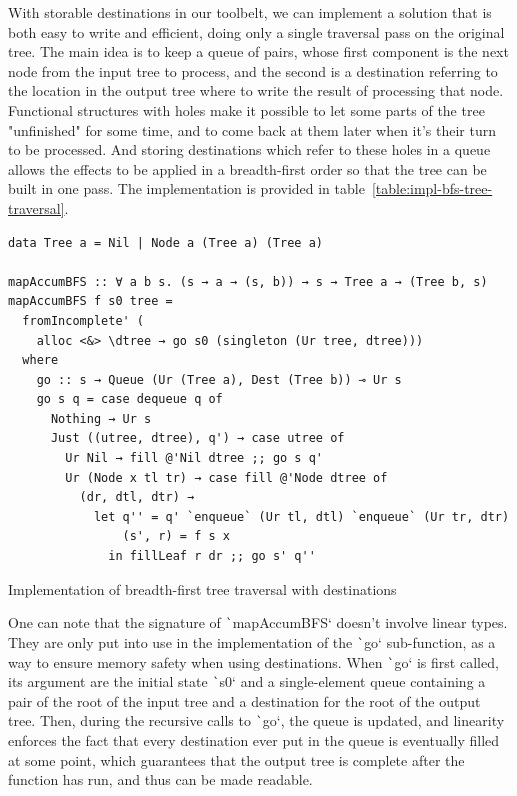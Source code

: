 \documentclass[english]{jflart}
\begin{document}
With storable destinations in our toolbelt, we can implement a solution that is both easy to write and efficient, doing only a single traversal pass on the original tree. The main idea is to keep a queue of pairs, whose first component is the next node from the input tree to process, and the second is a destination referring to the location in the output tree where to write the result of processing that node. Functional structures with holes make it possible to let some parts of the tree "unfinished" for some time, and to come back at them later when it's their turn to be processed. And storing destinations which refer to these holes in a queue allows the effects to be applied in a breadth-first order so that the tree can be built in one pass. The implementation is provided in table~\ref{table:impl-bfs-tree-traversal}.

\begin{table}[t]
\small
\begin{verbatim}
data Tree a = Nil | Node a (Tree a) (Tree a)

mapAccumBFS :: ∀ a b s. (s → a → (s, b)) → s → Tree a → (Tree b, s)
mapAccumBFS f s0 tree =
  fromIncomplete' (
    alloc <&> \dtree → go s0 (singleton (Ur tree, dtree)))
  where
    go :: s → Queue (Ur (Tree a), Dest (Tree b)) ⊸ Ur s
    go s q = case dequeue q of
      Nothing → Ur s
      Just ((utree, dtree), q') → case utree of
        Ur Nil → fill @'Nil dtree ;; go s q'
        Ur (Node x tl tr) → case fill @'Node dtree of
          (dr, dtl, dtr) →
            let q'' = q' `enqueue` (Ur tl, dtl) `enqueue` (Ur tr, dtr)
                (s', r) = f s x
              in fillLeaf r dr ;; go s' q''
\end{verbatim}
\caption{Implementation of breadth-first tree traversal with destinations}
\label{table:impl-bfs-tree-traversal}
\end{table}

One can note that the signature of \texttt`mapAccumBFS` doesn't involve linear types. They are only put into use in the implementation of the \texttt`go` sub-function, as a way to ensure memory safety when using destinations. When \texttt`go` is first called, its argument are the initial state \texttt`s0` and a single-element queue containing a pair of the root of the input tree and a destination for the root of the output tree. Then, during the recursive calls to \texttt`go`, the queue is updated, and linearity enforces the fact that every destination ever put in the queue is eventually filled at some point, which guarantees that the output tree is complete after the function has run, and thus can be made readable.
\end{document}
